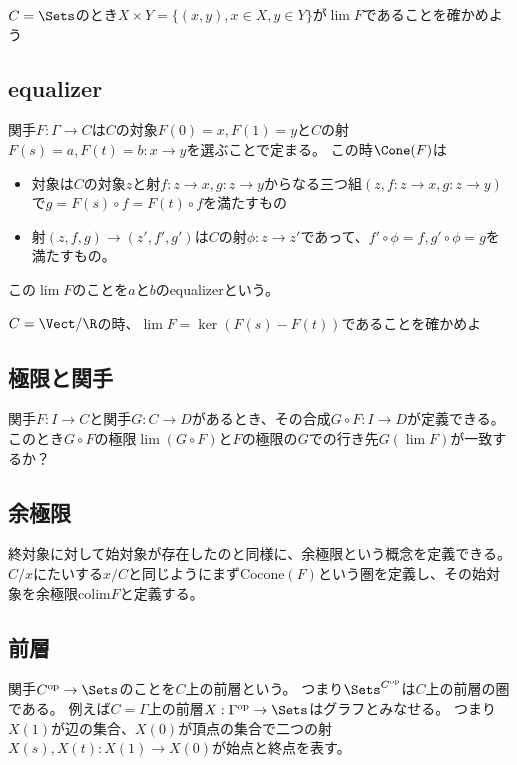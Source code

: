 \documentclass[uplatex]{jsarticle}
\begin{document}
\begin{prob}
$C=\Sets$のとき$X\times Y=\{(x,y),x\in X,y\in Y\}$が$\lim F$であることを確かめよう
\end{prob}

\subsection{equalizer}
関手$F:\Gamma\to C$は$C$の対象$F(0)=x, F(1)=y$と$C$の射$F(s)=a,F(t)=b:x\to y$を選ぶことで定まる。
この時$\Cone(F)$は
\begin{itemize}
\item 対象は$C$の対象$z$と射$f:z\to x,g:z\to y$からなる三つ組$(z, f:z\to x, g:z\to y)$で$g=F(s)\circ f=F(t)\circ f$を満たすもの
\item 射$(z,f,g)\to (z',f',g')$は$C$の射$\phi:z\to z'$であって、$f'\circ\phi=f, g'\circ\phi=g$を満たすもの。
\end{itemize}
この$\lim F$のことを$a$と$b$のequalizerという。
\begin{center}
\end{center}
\begin{prob}
$C=\Vect/\R$の時、$\lim F=\ker(F(s)-F(t))$であることを確かめよ
\end{prob}

\subsection{極限と関手}
関手$F:I\to C$と関手$G:C\to D$があるとき、その合成$G\circ F:I\to D$が定義できる。
このとき$G\circ F$の極限$\lim(G\circ F)$と$F$の極限の$G$での行き先$G(\lim F)$が一致するか？

\subsection{余極限}
終対象に対して始対象が存在したのと同様に、余極限という概念を定義できる。
$C/x$にたいする$x/C$と同じようにまず$\mathrm{Cocone}(F)$という圏を定義し、その始対象を余極限$\mathrm{colim}F$と定義する。
\subsection{前層}
関手$C^{\rm op}\to \Sets$のことを$C$上の前層という。
つまり$\Sets^{C^{\rm op}}$は$C$上の前層の圏である。
例えば$C=\Gamma$上の前層$X:\Gamma^{\rm op}\to \Sets$はグラフとみなせる。
つまり$X(1)$が辺の集合、$X(0)$が頂点の集合で二つの射$X(s), X(t):X(1)\to X(0)$が始点と終点を表す。
\end{document}
